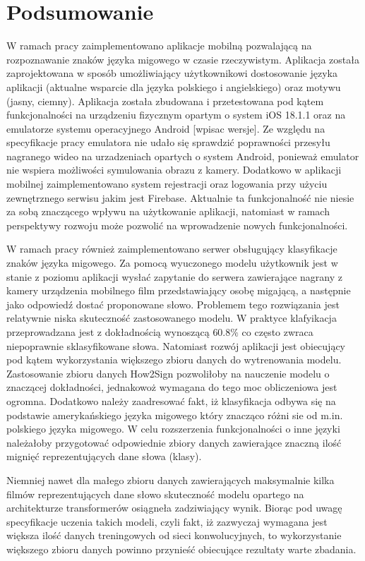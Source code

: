 \chapter{Podsumowanie}

W ramach pracy zaimplementowano aplikacje mobilną pozwalającą na rozpoznawanie znaków języka migowego w czasie rzeczywistym.
Aplikacja została zaprojektowana w sposób umożliwiający użytkownikowi dostosowanie języka aplikacji (aktualne wsparcie dla języka polskiego i angielskiego) oraz motywu (jasny, ciemny).
Aplikacja została zbudowana i przetestowana pod kątem funkcjonalności na urządzeniu fizycznym opartym o system iOS 18.1.1 oraz na emulatorze systemu operacyjnego Android [wpisac wersje].
Ze względu na specyfikacje pracy emulatora nie udało się sprawdzić poprawności przesyłu nagranego wideo na urzadzeniach opartych o system Android, ponieważ emulator nie wspiera możliwości symulowania obrazu z kamery.
Dodatkowo w aplikacji mobilnej zaimplementowano system rejestracji oraz logowania przy użyciu zewnętrznego serwisu jakim jest Firebase. 
Aktualnie ta funkcjonalność nie niesie za sobą znaczącego wpływu na użytkowanie aplikacji, natomiast w ramach perspektywy rozwoju może pozwolić na wprowadzenie nowych funkcjonalności.

W ramach pracy również zaimplementowano serwer obsługujący klasyfikacje znaków języka migowego.
Za pomocą wyuczonego modelu użytkownik jest w stanie z poziomu aplikacji wysłać zapytanie do serwera zawierające nagrany z kamery urządzenia mobilnego film przedstawiający osobę migającą, a następnie jako odpowiedź dostać proponowane słowo.
Problemem tego rozwiązania jest relatywnie niska skuteczność zastosowanego modelu. 
W praktyce klafyikacja przeprowadzana jest z dokładnością wynoszącą $60.8\%$ co często zwraca niepoprawnie sklasyfikowane słowa.
Natomiast rozwój aplikacji jest obiecujący pod kątem wykorzystania większego zbioru danych do wytrenowania modelu. 
Zastosowanie zbioru danych How2Sign pozwoliłoby na nauczenie modelu o znaczącej dokładności, jednakowoż wymagana do tego moc obliczeniowa jest ogromna.
Dodatkowo należy zaadresować fakt, iż klasyfikacja odbywa się na podstawie amerykańskiego języka migowego który znacząco różni sie od m.in. polskiego języka migowego.
W celu rozszerzenia funkcjonalności o inne języki należałoby przygotować odpowiednie zbiory danych zawierające znaczną ilość mignięć reprezentujących dane słowa (klasy).

Niemniej nawet dla małego zbioru danych zawierających maksymalnie kilka filmów reprezentujących dane słowo skuteczność modelu opartego na architekturze transformerów osiągneła zadziwiający wynik.
Biorąc pod uwagę specyfikacje uczenia takich modeli, czyli fakt, iż zazwyczaj wymagana jest większa ilość danych treningowych od sieci konwolucyjnych, to wykorzystanie większego zbioru danych powinno przynieść obiecujące rezultaty warte zbadania.


